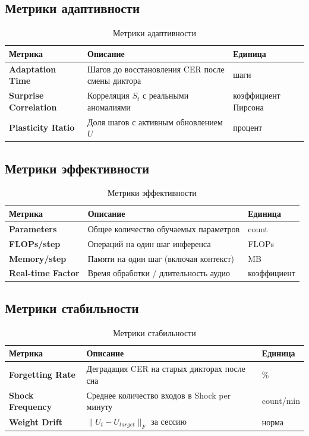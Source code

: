 \subsection{Метрики адаптивности}

\begin{table}[h]
\centering
\caption{Метрики адаптивности}
\label{tab:adaptivity_metrics}
\begin{tabular}{lp{6cm}l}
\toprule
\textbf{Метрика} & \textbf{Описание} & \textbf{Единица} \\
\midrule
\textbf{Adaptation Time} & Шагов до восстановления CER после смены диктора & шаги \\
\textbf{Surprise Correlation} & Корреляция $S_t$ с реальными аномалиями & коэффициент Пирсона \\
\textbf{Plasticity Ratio} & Доля шагов с активным обновлением $U$ & процент \\
\bottomrule
\end{tabular}
\end{table}

\subsection{Метрики эффективности}

\begin{table}[h]
\centering
\caption{Метрики эффективности}
\label{tab:efficiency_metrics}
\begin{tabular}{lp{6cm}l}
\toprule
\textbf{Метрика} & \textbf{Описание} & \textbf{Единица} \\
\midrule
\textbf{Parameters} & Общее количество обучаемых параметров & count \\
\textbf{FLOPs/step} & Операций на один шаг инференса & FLOPs \\
\textbf{Memory/step} & Памяти на один шаг (включая контекст) & MB \\
\textbf{Real-time Factor} & Время обработки / длительность аудио & коэффициент \\
\bottomrule
\end{tabular}
\end{table}

\subsection{Метрики стабильности}

\begin{table}[h]
\centering
\caption{Метрики стабильности}
\label{tab:stability_metrics}
\begin{tabular}{lp{6cm}l}
\toprule
\textbf{Метрика} & \textbf{Описание} & \textbf{Единица} \\
\midrule
\textbf{Forgetting Rate} & Деградация CER на старых дикторах после сна & \% \\
\textbf{Shock Frequency} & Среднее количество входов в Shock per минуту & count/min \\
\textbf{Weight Drift} & $\|U_t - U_{target}\|_F$ за сессию & норма \\
\bottomrule
\end{tabular}
\end{table}


